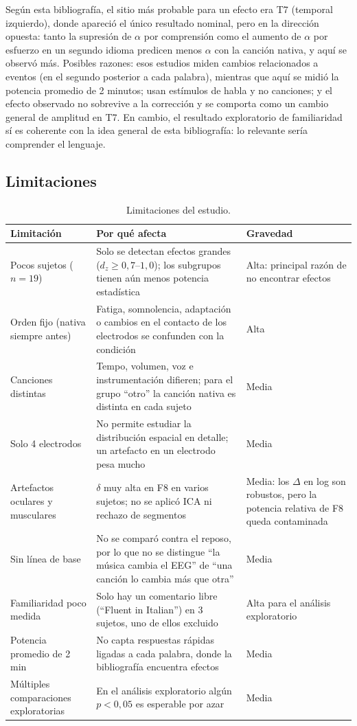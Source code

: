 \documentclass[11pt,a4paper]{article}
\begin{document}
Según esta bibliografía, el sitio más probable para un efecto era T7 (temporal izquierdo), donde apareció el único resultado nominal, pero en la dirección opuesta: tanto la supresión de $\alpha$ por comprensión como el aumento de $\alpha$ por esfuerzo en un segundo idioma predicen menos $\alpha$ con la canción nativa, y aquí se observó más. Posibles razones: esos estudios miden cambios relacionados a eventos (en el segundo posterior a cada palabra), mientras que aquí se midió la potencia promedio de 2 minutos; usan estímulos de habla y no canciones; y el efecto observado no sobrevive a la corrección y se comporta como un cambio general de amplitud en T7. En cambio, el resultado exploratorio de familiaridad sí es coherente con la idea general de esta bibliografía: lo relevante sería comprender el lenguaje.

\subsection{Limitaciones}
\begin{table}[H]
\centering
\caption{Limitaciones del estudio.}
\label{tab:lim1}
\small
\begin{tabularx}{\textwidth}{>{\raggedright\arraybackslash}p{3.4cm}X>{\raggedright\arraybackslash}p{3.4cm}}
\toprule
Limitación & Por qué afecta & Gravedad \\
\midrule
Pocos sujetos ($n = 19$) & Solo se detectan efectos grandes ($d_z \ge 0{,}7$--$1{,}0$); los subgrupos tienen aún menos potencia estadística & Alta: principal razón de no encontrar efectos \\
Orden fijo (nativa siempre antes) & Fatiga, somnolencia, adaptación o cambios en el contacto de los electrodos se confunden con la condición & Alta \\
Canciones distintas & Tempo, volumen, voz e instrumentación difieren; para el grupo ``otro'' la canción nativa es distinta en cada sujeto & Media \\
Solo 4 electrodos & No permite estudiar la distribución espacial en detalle; un artefacto en un electrodo pesa mucho & Media \\
Artefactos oculares y musculares & $\delta$ muy alta en F8 en varios sujetos; no se aplicó ICA ni rechazo de segmentos & Media: los $\Delta$ en log son robustos, pero la potencia relativa de F8 queda contaminada \\
Sin línea de base & No se comparó contra el reposo, por lo que no se distingue ``la música cambia el EEG'' de ``una canción lo cambia más que otra'' & Media \\
Familiaridad poco medida & Solo hay un comentario libre (``Fluent in Italian'') en 3 sujetos, uno de ellos excluido & Alta para el análisis exploratorio \\
Potencia promedio de 2 min & No capta respuestas rápidas ligadas a cada palabra, donde la bibliografía encuentra efectos & Media \\
Múltiples comparaciones exploratorias & En el análisis exploratorio algún $p < 0{,}05$ es esperable por azar & Media \\
\bottomrule
\end{tabularx}
\end{table}
\end{document}
